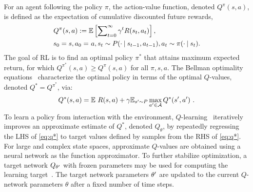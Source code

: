 For an agent following the policy $\pi$, the action-value
function, %
denoted $Q^\pi(s, a)$, is defined as the expectation of cumulative discounted
future rewards, \ie
\begin{align}
Q^\pi(s, a) :={}& \expected\left[ \sum\nolimits_{t=0}^\infty \gamma^t R(s_t, a_t) \right], \\
s_0 = s, a_0 =&~a, s_t \sim P(\cdot \mid s_{t-1}, a_{t-1}), a_t \sim \pi(\cdot \mid s_{t}). \nonumber %
\end{align}
The goal of RL is to find an optimal policy $\pi^*$
that attains maximum expected return,
for which $Q^{\pi^*}(s, a) \geq Q^{\pi}(s, a)$ for all $\pi, s, a$.
The Bellman optimality equations~\citep{bellman1957dynamic} characterize
the optimal policy in terms of the optimal $Q$-values, denoted
$Q^* = Q^{\pi^*}$, via:
\begin{equation}
Q^*(s, a) = \mathbb{E}\ R(s, a) + \gamma \mathbb{E}_{s'\sim P} \max_{a' \in \mathcal{A}} Q^*(s', a')~.
\label{eq:q*}
\end{equation}
To %
learn a policy from interaction with the environment,
$Q$-learning~\citep{watkins1992q} iteratively improves an
approximate estimate of $Q^*$, denoted $Q_{\theta}$, by repeatedly
regressing the LHS of \eqref{eq:q*} to target values defined by samples from the RHS of \eqref{eq:q*}.
For large and complex state spaces, approximate $Q$-values are obtained
using a neural network as the function approximator.
To further stabilize optimization, a target network $Q_{\theta^{\prime}}$ with frozen
parameters may be used for computing the learning target~\citep{mnih2013playing}. The target
network parameters $\theta^{\prime}$ are updated to the current $Q$-network
parameters $\theta$ after a fixed number of time
steps.

